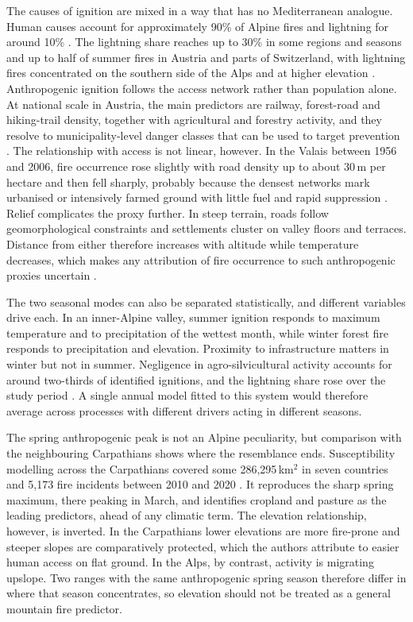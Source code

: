 \documentclass[11pt,a4paper]{article}
\begin{document}
The causes of ignition are mixed in a way that has no Mediterranean analogue. Human causes account for approximately 90\% of Alpine fires and lightning for around 10\% \citep{muller_forest_2020}. The lightning share reaches up to 30\% in some regions and seasons and up to half of summer fires in Austria and parts of Switzerland, with lightning fires concentrated on the southern side of the Alps and at higher elevation \citep{muller_forest_2020, valese_wildfires_2011, conedera_lightninginduced_2006}. Anthropogenic ignition follows the access network rather than population alone. At national scale in Austria, the main predictors are railway, forest-road and hiking-trail density, together with agricultural and forestry activity, and they resolve to municipality-level danger classes that can be used to target prevention \citep{arndt_modeling_2013}. The relationship with access is not linear, however. In the Valais between 1956 and 2006, fire occurrence rose slightly with road density up to about 30\,m per hectare and then fell sharply, probably because the densest networks mark urbanised or intensively farmed ground with little fuel and rapid suppression \citep{zumbrunnen_human_2012}. Relief complicates the proxy further. In steep terrain, roads follow geomorphological constraints and settlements cluster on valley floors and terraces. Distance from either therefore increases with altitude while temperature decreases, which makes any attribution of fire occurrence to such anthropogenic proxies uncertain \citep{bekar_crossregional_2020}.

The two seasonal modes can also be separated statistically, and different variables drive each. In an inner-Alpine valley, summer ignition responds to maximum temperature and to precipitation of the wettest month, while winter forest fire responds to precipitation and elevation. Proximity to infrastructure matters in winter but not in summer. Negligence in agro-silvicultural activity accounts for around two-thirds of identified ignitions, and the lightning share rose over the study period \citep{vacchiano_modeling_2018}. A single annual model fitted to this system would therefore average across processes with different drivers acting in different seasons.

The spring anthropogenic peak is not an Alpine peculiarity, but comparison with the neighbouring Carpathians shows where the resemblance ends. Susceptibility modelling across the Carpathians covered some 286{,}295\,km$^2$ in seven countries and 5{,}173 fire incidents between 2010 and 2020 \citep{manczinger_fire_2025}. It reproduces the sharp spring maximum, there peaking in March, and identifies cropland and pasture as the leading predictors, ahead of any climatic term. The elevation relationship, however, is inverted. In the Carpathians lower elevations are more fire-prone and steeper slopes are comparatively protected, which the authors attribute to easier human access on flat ground. In the Alps, by contrast, activity is migrating upslope. Two ranges with the same anthropogenic spring season therefore differ in where that season concentrates, so elevation should not be treated as a general mountain fire predictor.
\end{document}
